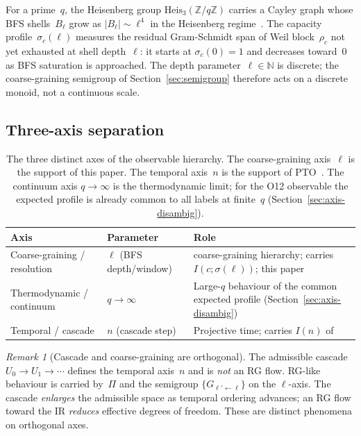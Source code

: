 \documentclass[11pt,a4paper]{article}
\theoremstyle{plain}
\theoremstyle{definition}
\theoremstyle{remark}
\newtheorem{remark}[theorem]{Remark}
\begin{document}
    For a prime~$q$, the Heisenberg group $\mathrm{Heis}_3(\mathbb{Z}/q\mathbb{Z})$
    carries a Cayley graph whose BFS shells~$B_\ell$ grow as $|B_\ell| \sim \ell^4$
    in the Heisenberg regime~\cite{Beau2026a16}.
    The capacity profile~$\sigma_c(\ell)$ measures the residual Gram-Schmidt span
    of Weil block~$\rho_c$ not yet exhausted at shell depth~$\ell$:
    it starts at $\sigma_c(0) = 1$ and decreases toward~$0$
    as BFS saturation is approached.
    The depth parameter~$\ell \in \mathbb{N}$ is discrete;
    the coarse-graining semigroup of Section~\ref{sec:semigroup}
    therefore acts on a discrete monoid, not a continuous scale.

  \subsection{Three-axis separation}
    \label{sec:axes}

    \begin{table}[h]
      \centering
      \small
      \begin{tabular}{p{}p{}p{}}
        \toprule
        Axis & Parameter & Role \\
        \midrule
        Coarse-graining / resolution
        & $\ell$ (BFS depth/window)
        & coarse-graining hierarchy; carries $I(c;\sigma(\ell))$; this paper \\
        Thermodynamic / continuum
        & $q \to \infty$
        & Large-$q$ behaviour of the common expected profile (Section~\ref{sec:axis-disambig}) \\
        Temporal / cascade
        & $n$ (cascade step)
        & Projective time; carries $I(n)$ of~\cite{Beau2026pto} \\
        \bottomrule
      \end{tabular}
      \caption{The three distinct axes of the observable hierarchy.
      The coarse-graining axis~$\ell$ is the support of this paper.
      The temporal axis~$n$ is the support of PTO~\cite{Beau2026pto}.
      The continuum axis $q \to \infty$ is the thermodynamic limit;
      for the O12 observable the expected profile is already common to all labels at
      finite~$q$ (Section~\ref{sec:axis-disambig}).}
      \label{tab:axes}
    \end{table}

    \begin{remark}[Cascade and coarse-graining are orthogonal]
      \label{rem:axes}
      The admissible cascade $U_0 \to U_1 \to \cdots$ defines the temporal axis~$n$
      and is \emph{not} an RG flow.
      RG-like behaviour is carried by~$\Pi$ and the semigroup $\{G_{\ell' \leftarrow \ell}\}$
      on the $\ell$-axis.
      The cascade \emph{enlarges} the admissible space as temporal ordering advances;
      an RG flow toward the IR \emph{reduces} effective degrees of freedom.
      These are distinct phenomena on orthogonal axes.
    \end{remark}
\end{document}
